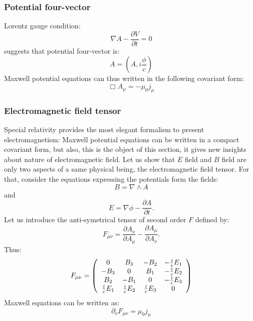 \documentclass[12pt]{book}
\begin{document}
\subsubsection{Potential four-vector}
Lorentz gauge condition:
\begin{equation}
\nabla A-\frac{\partial V}{\partial t}=0
\end{equation}
suggests that potential four-vector is:
\begin{equation}
A=(A,i\frac{\phi}{c})
\end{equation}
Maxwell potential equations can thus written in the following covariant form:
\begin{equation}
\Box A_\mu=-\mu_0j_\mu
\end{equation}
\subsubsection{Electromagnetic field tensor}
Special relativity provides the most elegant formalism to
present electromagnetism: Maxwell potential equations can be written
in a compact 
covariant form, but also, this is the object of this section, it gives new
insights about nature of electromagnetic field. Let us show that $E$ field and
$B$
field are only two aspects of a same physical being, the electromagnetic field
tensor. For that, consider the equations expressing the potentials form the
fields: 
\begin{equation}
B=\nabla\wedge A
\end{equation}
and
\begin{equation}
E=\nabla \phi-\frac{\partial A}{\partial t}.
\end{equation}
Let us introduce the anti-symetrical tensor
 of second order $F$ defined by:
\begin{equation}
F_{\mu\nu}=\frac{\partial A_{\nu}}{\partial A_{\mu}}- \frac{\partial
  A_{\mu}}{\partial A_{\nu}}. 
\end{equation}
Thus:
\begin{equation}
F_{\mu\nu}=
\left( \begin{array}{cccc}
0&B_3&-B_2&-\frac{i}{c}E_1\cr
-B_3&0&B_1&-\frac{i}{c}E_2\cr
B_2&-B_1&0&-\frac{i}{c}E_3\cr
\frac{i}{c}E_1&\frac{i}{c}E_2&\frac{i}{c}E_3&0\cr
\end{array} \right)
\end{equation}
Maxwell equations can be written as:
\begin{equation}
\partial_{\nu}F_{\mu\nu}=\mu_0j_{\mu}
\end{equation}
\end{document}
